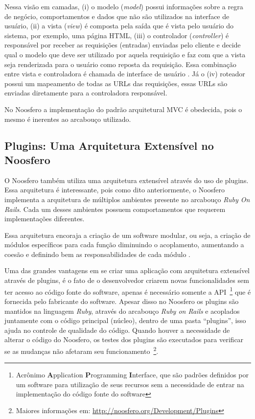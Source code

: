 Nessa visão em camadas, (i) o modelo (\textit{model}) possui informações sobre a regra de negócio, comportamentos e dados que não são utilizados na interface de usuário, (ii) a vista (\textit{view}) é composta pela saída que é vista pelo usuário do sistema, por exemplo, uma página HTML, (iii) o controlador (\textit{controller}) é responsável por receber as requisições (entradas) enviadas pelo cliente e decide qual o modelo que deve ser utilizado por aquela requisição e faz com que a vista seja renderizada para o usuário como reposta da requisição. Essa combinação entre vista e controladora é chamada de interface de usuário \cite{fowler2006padroes}. Já o (iv) roteador possui um mapeamento de todas as URLs das requisições, essas URLs são enviadas diretamente para a controladora responsável.

No Noosfero a implementação do padrão arquitetural MVC é obedecida, pois o mesmo é inerentes ao arcabouço utilizado.

\subsection{Plugins: Uma Arquitetura Extensível no Noosfero}
\label{sub:arquiteturaplugin}
O Noosfero também utiliza uma arquitetura extensível através do uso de plugins. Essa arquitetura é interessante, pois como dito anteriormente, o Noosfero implementa a arquitetura de múltiplos ambientes presente no arcabouço \textit{Ruby On Rails}. Cada um desses ambientes possuem comportamentos que requerem implementações diferentes.
 
Essa arquitetura encoraja a criação de um software modular, ou seja, a criação de módulos específicos para cada função diminuindo o acoplamento, aumentando a coesão e definindo bem as responsabilidades de cada módulo \cite{rozanski2005architecture}.  

Uma das grandes vantagens em se criar uma aplicação com arquitetura extensível através de plugins, é o fato de o desenvolvedor criarem novas funcionalidades sem ter acesso ao código fonte do software, apenas é necessário somente a API~\footnote{Acrônimo \textbf{A}pplication \textbf{P}rogramming \textbf{I}nterface, que são padrões definidos por um software para utilização de seus recursos sem a necessidade de entrar na implementação do código fonte do software} que é fornecida pelo fabricante do software. Apesar disso no Noosfero os plugins são mantidos na linguagem \textit{Ruby}, através do arcabouço \textit{Ruby on Rails} e acoplados juntamente com o código principal (núcleo), dentro de uma pasta “plugins”, isso ajuda no controle de qualidade do código. Quando houver a necessidade de alterar o código do Noosfero, os testes dos plugins são executados para verificar se as mudanças não afetaram seu funcionamento~\footnote{Maiores informações em: \url{http://noosfero.org/Development/Plugins}}.


